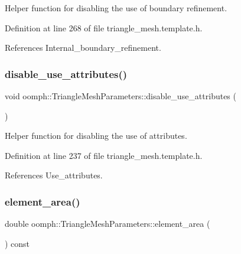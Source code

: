 Helper function for disabling the use of boundary refinement. 



Definition at line 268 of file triangle\+\_\+mesh.\+template.\+h.



References Internal\+\_\+boundary\+\_\+refinement.

\mbox{\label{classoomph_1_1TriangleMeshParameters_a53e52b559d2fed50b0dace99f0532998}} 
\subsubsection{\texorpdfstring{disable\+\_\+use\+\_\+attributes()}{disable\_use\_attributes()}}
{\footnotesize\ttfamily void oomph\+::\+Triangle\+Mesh\+Parameters\+::disable\+\_\+use\+\_\+attributes (\begin{DoxyParamCaption}{ }\end{DoxyParamCaption})\hspace{0.3cm}{\ttfamily [inline]}}



Helper function for disabling the use of attributes. 



Definition at line 237 of file triangle\+\_\+mesh.\+template.\+h.



References Use\+\_\+attributes.

\mbox{\label{classoomph_1_1TriangleMeshParameters_a58761d517c8e5721bcba9bdd0ffcda7c}} 
\subsubsection{\texorpdfstring{element\+\_\+area()}{element\_area()}\hspace{0.1cm}{\footnotesize\ttfamily [1/2]}}
{\footnotesize\ttfamily double oomph\+::\+Triangle\+Mesh\+Parameters\+::element\+\_\+area (\begin{DoxyParamCaption}{ }\end{DoxyParamCaption}) const\hspace{0.3cm}{\ttfamily [inline]}}



